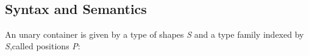 \begin{code}%
\>[0]\AgdaSpace{}%
\AgdaSymbol{:}\AgdaSpace{}%
\AgdaSpace{}%
\AgdaSpace{}%
\<%
\\
\>[0]\AgdaSpace{}%
\AgdaSymbol{(}\AgdaSpace{}%
\AgdaSymbol{)}\AgdaSpace{}%
\AgdaSymbol{=}\AgdaSpace{}%
\AgdaSpace{}%
\AgdaSymbol{(}\AgdaSpace{}%
\AgdaSymbol{)}\<%
\\
%
\\[\AgdaEmptyExtraSkip]%
\>[0]\AgdaSpace{}%
\AgdaSymbol{:}\AgdaSpace{}%
\<%
\\
\>[0]\AgdaSpace{}%
\AgdaSymbol{=}\AgdaSpace{}%
\AgdaSpace{}%
\AgdaSymbol{(}\AgdaSpace{}%
\AgdaSymbol{)}\<%
\end{code}

\subsection{Syntax and Semantics}

An unary container is given by a type of shapes \textit{S} and a type family indexed by \textit{S},called positions \textit{P}:

\begin{code}%
\>[0]\AgdaSpace{}%
\AgdaSpace{}%
\AgdaSymbol{:}\AgdaSpace{}%
\AgdaSpace{}%
\<%
\\
\>[0][@{}l@{\AgdaIndent{0}}]%
\>[2]\AgdaSpace{}%
\<%
\\
%
\>[2]\<%
\\
\>[2][@{}l@{\AgdaIndent{0}}]%
\>[4]\AgdaSpace{}%
\AgdaSymbol{:}\AgdaSpace{}%
\<%
\\
%
\>[4]\AgdaSpace{}%
\AgdaSymbol{:}\AgdaSpace{}%
\AgdaSpace{}%
\AgdaSpace{}%
\<%
\end{code}

\begin{code}[hide]%
\>[0]\AgdaSpace{}%
\AgdaSpace{}%
\AgdaSpace{}%
\AgdaSpace{}%
\AgdaSpace{}%
\AgdaSpace{}%
\AgdaSymbol{:}\AgdaSpace{}%
\<%
\end{code}

